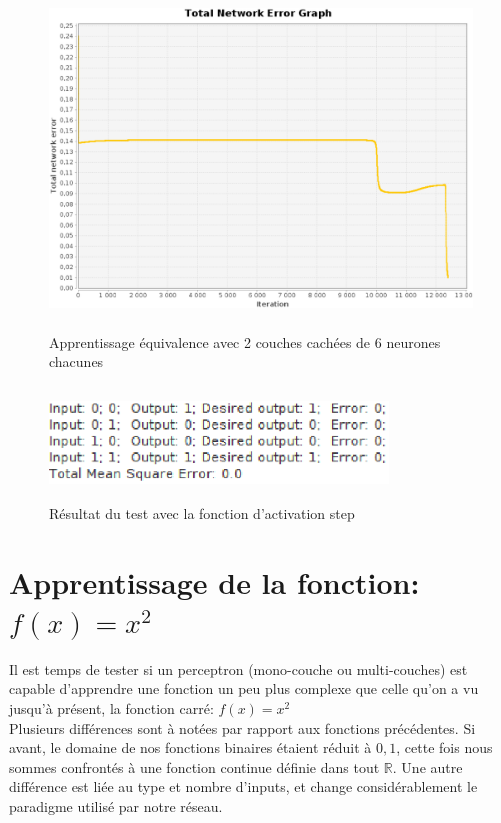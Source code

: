 \documentclass[twoside,openright,a4paper,11pt,french]{article}
\begin{document}
\begin{figure}[ht]
\centering
\includegraphics[width=12cm,height=9cm]{./pics/eq/multi_6_6_def.eps}
\caption{Apprentissage équivalence avec 2 couches cachées de 6 neurones chacunes}
\label{fig:eqmult2cc6}
\end{figure}

\begin{figure}[ht]
\centering
\includegraphics[width=9cm,height=3cm]{./pics/eq/stepeq.eps}
\caption{Résultat du test avec la fonction d'activation step}
\label{fig:eqstep}
\end{figure}

\clearpage



\section{Apprentissage de la fonction: $f(x) = x^2$}

Il est temps de tester si un perceptron (mono-couche ou multi-couches) est
capable d'apprendre une fonction un peu plus complexe que celle qu'on a vu
jusqu'à présent, la fonction carré: $f(x) = x^2$ \\

Plusieurs différences sont à notées par rapport aux fonctions précédentes.
Si avant, le domaine de nos fonctions binaires étaient réduit à ${0,1}$, cette
fois nous sommes confrontés à une fonction continue définie dans tout $\mathbb{R}$.
Une autre différence est liée au type et nombre d'inputs, et change
considérablement le paradigme utilisé par notre réseau.
\end{document}

